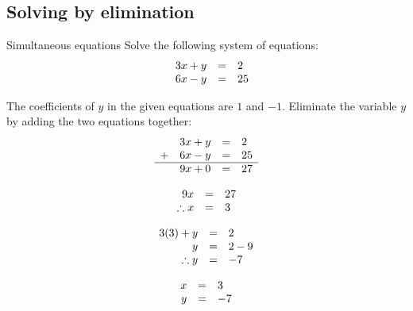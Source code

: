 \subsection*{Solving by elimination}

\begin{wex}
{Simultaneous equations }
{
Solve the following system of equations:
\begin{equation*}
\begin{array}{ccll}\hfill & 3x+y& =& 2\hfill \\ 

\hfill& 6x-y& =& 25\hfill 
\end{array}
\end{equation*}
}
{
The coefficients of $y$ in the given equations are $1$ and $-1$. Eliminate the variable $y$ by adding the two equations together:
\begin{equation*}
\begin{array}{ccll}\hfill & 3x+y& =& 2\hfill \\ 
\hfill+ & 6x-y& =& 25\hfill \\ \hline
 \hfill & 9x + 0 &=& 27
\end{array}
\end{equation*}


\begin{equation*}
    \begin{array}{ccl}\hfill 9x& =& 27\hfill \\
	\hfill \therefore x  & =& 3\hfill 
    \end{array}
\end{equation*}

\begin{equation*}
    \begin{array}{ccl}\hfill 3(3) + y &=& 2\\
	\hfill y & =& 2-9\\
	\hfill \therefore y & =& -7 
   \end{array}
\end{equation*}


\begin{equation*}
\begin{array}{ccc}
 \hfill x& =& 3\hfill \\
\hfill y& =& -7\hfill 
\end{array}
\end{equation*}
}
\end{wex}

